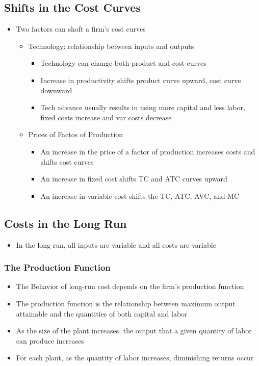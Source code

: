 \documentclass[11pt]{article}
\begin{document}
\subsection{Shifts in the Cost Curves}
\label{sec:orga3c1dfa}
\begin{itemize}
\item Two factors can shoft a firm's cost curves
\begin{itemize}
\item Technology: relationship between inputs and outputs
\begin{itemize}
\item Technology can change both product and cost curves
\item Increase in productivity shifts product curve upward, cost curve downward
\item Tech advance usually results in using more capital and less labor, fixed costs     increase and var costs decrease
\end{itemize}
\item Prices of Factos of Production
\begin{itemize}
\item An increase in the price of a factor of production increases costs and shifts cost curves
\item An increase in fixed cost shifts TC and ATC curves upward
\item An increase in variable cost shifts the TC, ATC, AVC, and MC
\end{itemize}
\end{itemize}
\end{itemize}
\subsection{Costs in the Long Run}
\label{sec:org8c3de3d}
\begin{itemize}
\item In the long run, all inputs are variable and all costs are variable
\end{itemize}
\subsubsection{The Production Function}
\label{sec:org78ae09a}
\begin{itemize}
\item The Behavior of long-run cost depends on the firm's production function
\item The production function is the relationship between maximum output attainable and the quantities of both capital and labor
\item As the size of the plant increases, the output that a given quantity of labor can produce increases
\item For each plant, as the quantity of labor increases, diminishing returns occur
\end{itemize}
\end{document}
